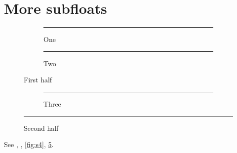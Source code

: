 \documentclass{article}
\begin{document}
\listoffigures
\section{More subfloats}
\begin{figure}[htbp]
\centering
\begin{subfigure}{.3\linewidth}\centering\rule{2cm}{1cm}\caption{One}\label{fig:s1}\end{subfigure}
\begin{subfigure}{.3\linewidth}\centering\rule{2cm}{1cm}\caption{Two}\label{fig:s2}\end{subfigure}
\caption{First half}\label{fig:half1}
\end{figure}
\begin{figure}[htbp]
\ContinuedFloat
\centering
\begin{subfigure}{.3\linewidth}\centering\rule{2cm}{1cm}\caption{Three}\label{fig:s3}\end{subfigure}
\begin{minipage}{.3\linewidth}\centering\rule{2cm}{1cm}\label{fig:s4}\end{minipage}
\caption{Second half}\label{fig:half2}
\end{figure}
See , , \ref{fig:s4}, \ref{fig:half2}.
\end{document}
